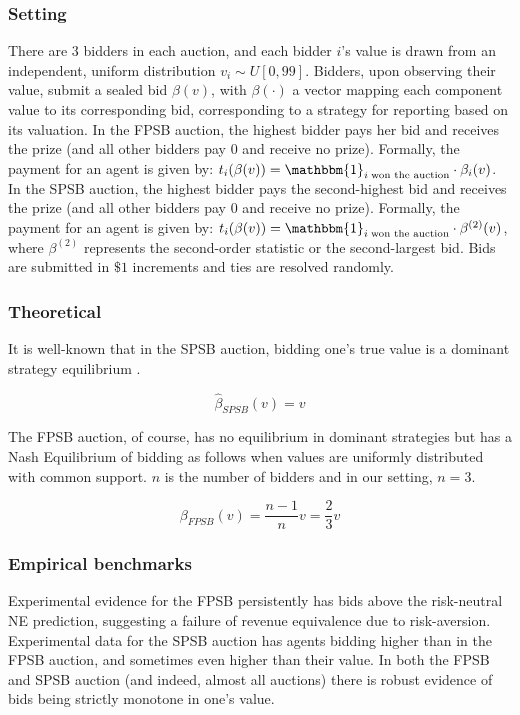 \documentclass{article} %
\begin{document}
\subsubsection{Setting}
There are $3$ bidders in each auction, and each bidder $i$'s value is drawn from an independent, uniform distribution $v_i \sim U[0, 99]$. 
Bidders, upon observing their value, submit a sealed bid $\beta(v)$, with $\beta(\cdot)$ a vector mapping each component value to its corresponding bid, corresponding to a strategy for reporting based on its valuation. 
In the FPSB auction, the highest bidder pays her bid and receives the prize (and all other bidders pay $0$ and receive no prize). Formally, the payment for an agent is given by: $t_i(\beta(v)) = \mathbbm{1}_{i \; \text{won the auction}}\cdot \beta_i(v)$. 
In the SPSB auction, the highest bidder pays the second-highest bid and receives the prize (and all other bidders pay $0$ and receive no prize). 
Formally, the payment for an agent is given by: $t_i(\beta(v)) = \mathbbm{1}_{i \; \text{won the auction}} \cdot \beta^{(2)}(v)$, where $\beta^{(2)}$ represents the second-order statistic or the second-largest bid. 
Bids are submitted in $\$1$ increments and ties are resolved randomly. 

\subsubsection{Theoretical }

It is well-known that in the SPSB auction, bidding one's true value is a dominant strategy equilibrium \cite{krishna2009auction}. 

\begin{equation}
    \hat{\beta}_{SPSB}(v) = v
\end{equation}

The FPSB auction, of course, has no equilibrium in dominant strategies but has a Nash Equilibrium of bidding as follows when values are uniformly distributed with common support. 
$n$ is the number of bidders and in our setting, $n=3$.

\begin{equation}
    \beta_{FPSB}(v) =  \frac{n-1}{n} v = \frac{2}{3}v
\end{equation}




\subsubsection{Empirical benchmarks}
Experimental evidence for the FPSB persistently has bids above the risk-neutral NE prediction, suggesting a failure of revenue equivalence due to risk-aversion. 
Experimental data for the SPSB auction has agents bidding higher than in the FPSB auction, and sometimes even higher than their value. 
In both the FPSB and SPSB auction (and indeed, almost all auctions) there is robust evidence of bids being strictly monotone in one's value. 
\end{document}
